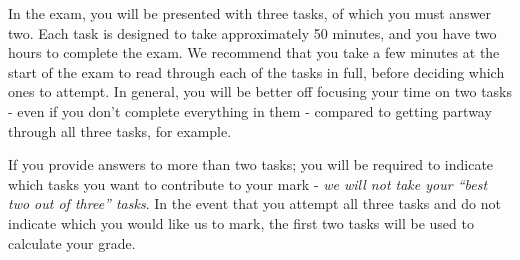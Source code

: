 In the exam, you will be presented with three tasks, of which you must answer two.
Each task is designed to take approximately 50 minutes, and you have two hours to complete the exam.
We recommend that you take a few minutes at the start of the exam to read through each of the tasks in full, before deciding which ones to attempt.
In general, you will be better off focusing your time on two tasks - even if you don't complete everything in them - compared to getting partway through all three tasks, for example.

If you provide answers to more than two tasks; you will be required to indicate which tasks you want to contribute to your mark - \emph{we will not take your ``best two out of three'' tasks}.
In the event that you attempt all three tasks and do not indicate which you would like us to mark, the first two tasks will be used to calculate your grade.
